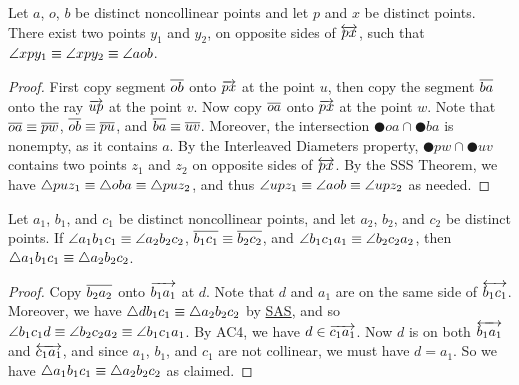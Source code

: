 \begin{construct}
Let \(a\), \(o\), \(b\) be distinct noncollinear points and let \(p\) and \(x\) be distinct points.
There exist two points \(y_1\) and \(y_2\), on opposite sides of \(\overleftrightarrow{px}\), such that \(\angle{xpy_1} \equiv \angle{xpy_2} \equiv \angle{aob}\). 
\end{construct}

\begin{proof}
First copy segment \(\overline{ob}\) onto \(\overrightarrow{px}\) at the point \(u\), then copy the segment \(\overline{ba}\) onto the ray \(\overrightarrow{up}\) at the point \(v\).
Now copy \(\overline{oa}\) onto \(\overrightarrow{px}\) at the point \(w\).
Note that \(\overline{oa} \equiv \overline{pw}\), \(\overline{ob} \equiv \overline{pu}\), and \(\overline{ba} \equiv \overline{uv}\).
Moreover, the intersection \(\CIRCLE{o}{a} \cap \CIRCLE{b}{a}\) is nonempty, as it contains \(a\).
By the Interleaved Diameters property, \(\CIRCLE{p}{w} \cap \CIRCLE{u}{v}\) contains two points \(z_1\) and \(z_2\) on opposite sides of \(\overleftrightarrow{px}\).
By the SSS Theorem, we have \(\bigtriangleup{puz_1} \equiv \bigtriangleup{oba} \equiv \bigtriangleup{puz_2}\), and thus \(\angle{upz_1} \equiv \angle{aob} \equiv \angle{upz_2}\) as needed.
\end{proof}

\begin{prop}
Let \(a_1\), \(b_1\), and \(c_1\) be distinct noncollinear points, and let \(a_2\), \(b_2\), and \(c_2\) be distinct points.
If \(\angle{a_1b_1c_1} \equiv \angle{a_2b_2c_2}\), \(\overline{b_1c_1} \equiv \overline{b_2c_2}\), and \(\angle{b_1c_1a_1} \equiv \angle{b_2c_2a_2}\), then \(\bigtriangleup{a_1b_1c_1} \equiv \bigtriangleup{a_2b_2c_2}\).
\end{prop}

\begin{proof}
Copy \(\overline{b_2a_2}\) onto \(\overrightarrow{b_1a_1}\) at \(d\).
Note that \(d\) and \(a_1\) are on the same side of \(\overleftrightarrow{b_1c_1}\).
Moreover, we have \(\bigtriangleup{db_1c_1} \equiv \bigtriangleup{a_2b_2c_2}\) by \hyperref[prop:sas-theorem]{SAS}, and so \(\angle{b_1c_1d} \equiv \angle{b_2c_2a_2} \equiv \angle{b_1c_1a_1}\).
By AC4, we have \(d \in \overrightarrow{c_1a_1}\).
Now \(d\) is on both \(\overleftrightarrow{b_1a_1}\) and \(\overleftrightarrow{c_1a_1}\), and since \(a_1\), \(b_1\), and \(c_1\) are not collinear, we must have \(d = a_1\).
So we have \(\bigtriangleup{a_1b_1c_1} \equiv \bigtriangleup{a_2b_2c_2}\) as claimed.
\end{proof}
